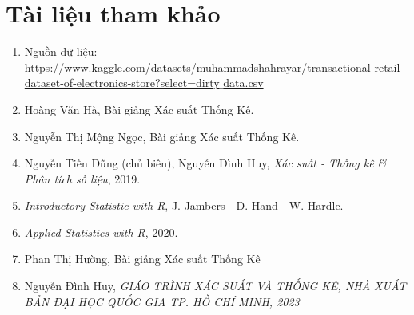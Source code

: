 \part*{Tài liệu tham khảo}
\begin{enumerate}
    \item Nguồn dữ liệu: \href{https://www.kaggle.com/datasets/muhammadshahrayar/transactional-retail-dataset-of-electronics-store?select=dirty_data.csv}{https://www.kaggle.com/datasets/muhammadshahrayar/transactional-retail-dataset-of-electronics-store?select=dirty$\_$data.csv}
    \item Hoàng Văn Hà, Bài giảng Xác suất Thống Kê.
    \item Nguyễn Thị Mộng Ngọc, Bài giảng Xác suất Thống Kê.
    \item Nguyễn Tiến Dũng (chủ biên), Nguyễn Đình Huy, \textit{Xác suất - Thống kê \& Phân tích số liệu}, 2019.
    \item \textit{Introductory Statistic with R}, J. Jambers - D. Hand - W. Hardle.
    \item \textit{Applied Statistics with R}, 2020.
    \item Phan Thị Hường, Bài giảng Xác suất Thống Kê
    \item Nguyễn Đình Huy, \textit{GIÁO TRÌNH XÁC SUẤT VÀ THỐNG KÊ, NHÀ XUẤT BẢN ĐẠI HỌC QUỐC GIA TP. HỒ CHÍ MINH, 2023}
\end{enumerate}
